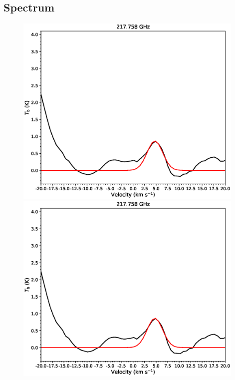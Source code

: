 \subsection{Spectrum}
\begin{figure}[htbp] 
\begin{center}
\begin{minipage}{0.98\textwidth} 
\begin{center}
\begin{minipage}{0.48\textwidth}
\begin{center}
\includegraphics[width=0.98\textwidth]{OrionKL/spectrum/HC/217.758328w_fit.eps}
\end{center}
\end{minipage}
\begin{minipage}{0.48\textwidth}
\begin{center}
\includegraphics[width=0.98\textwidth]{OrionKL/spectrum/HC/217.758328w_fit.eps}

\end{center}
\end{minipage}
\end{center}
\end{minipage}
\end{center}
\end{figure}

